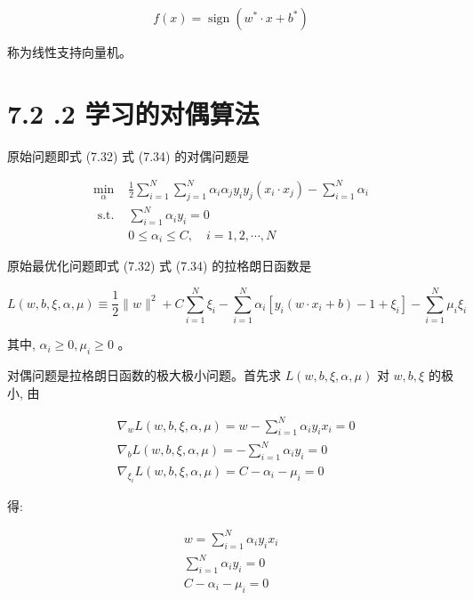 \documentclass[10pt]{article}
\begin{document}
\begin{equation*}
f(x)=\operatorname{sign}\left(w^{*} \cdot x+b^{*}\right) \tag{7.36}
\end{equation*}


称为线性支持向量机。

\section*{7.2 .2 学习的对偶算法}
原始问题即式 (7.32) 式 (7.34) 的对偶问题是

\[
\begin{array}{ll}
\min _{\alpha} & \frac{1}{2} \sum_{i=1}^{N} \sum_{j=1}^{N} \alpha_{i} \alpha_{j} y_{i} y_{j}\left(x_{i} \cdot x_{j}\right)-\sum_{i=1}^{N} \alpha_{i} \\
\text { s.t. } & \sum_{i=1}^{N} \alpha_{i} y_{i}=0 \\
& 0 \leqslant \alpha_{i} \leqslant C, \quad i=1,2, \cdots, N \tag{7.39}
\end{array}
\]

原始最优化问题即式 (7.32) 式 (7.34) 的拉格朗日函数是


\begin{equation*}
L(w, b, \xi, \alpha, \mu) \equiv \frac{1}{2}\|w\|^{2}+C \sum_{i=1}^{N} \xi_{i}-\sum_{i=1}^{N} \alpha_{i}\left[y_{i}\left(w \cdot x_{i}+b\right)-1+\xi_{i}\right]-\sum_{i=1}^{N} \mu_{i} \xi_{i} \tag{7.40}
\end{equation*}


其中, $\alpha_{i} \geqslant 0, \mu_{i} \geqslant 0$ 。

对偶问题是拉格朗日函数的极大极小问题。首先求 $L(w, b, \xi, \alpha, \mu)$ 对 $w, b, \xi$ 的极小, 由

$$
\begin{aligned}
& \nabla_{w} L(w, b, \xi, \alpha, \mu)=w-\sum_{i=1}^{N} \alpha_{i} y_{i} x_{i}=0 \\
& \nabla_{b} L(w, b, \xi, \alpha, \mu)=-\sum_{i=1}^{N} \alpha_{i} y_{i}=0 \\
& \nabla_{\xi_{i}} L(w, b, \xi, \alpha, \mu)=C-\alpha_{i}-\mu_{i}=0
\end{aligned}
$$

得:


\begin{gather*}
w=\sum_{i=1}^{N} \alpha_{i} y_{i} x_{i}  \tag{7.41}\\
\sum_{i=1}^{N} \alpha_{i} y_{i}=0  \tag{7.42}\\
C-\alpha_{i}-\mu_{i}=0 \tag{7.43}
\end{gather*}
\end{document}
